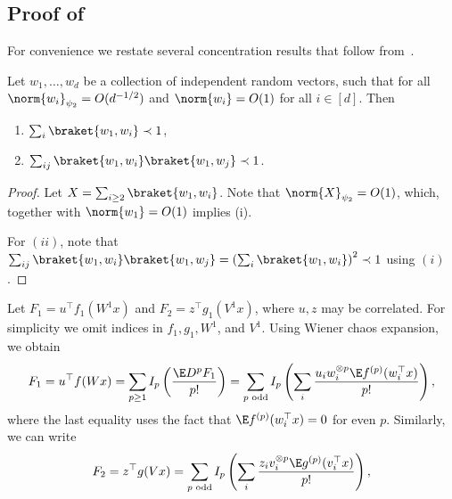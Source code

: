 
\subsection{Proof of~}
For convenience we restate several concentration results that follow from~.
\begin{lemma}
\label{lem:conc_inequalities}
    Let \(w_1, \ldots, w_d\) be a collection of independent random vectors, such that for all \(\norm{w_i}_{\psi_2} = O(d^{-1/2})\) and \(\norm{w_i} = O(1)\) for all \(i \in [d]\).
    Then 
    \begin{enumerate}[label=(\roman*)]
        \item \(\sum_i \braket{w_1, w_i} \prec 1\),
        \item \(\sum_{ij} \braket{w_1, w_i} \braket{w_1, w_j} \prec 1\).
    \end{enumerate}
\end{lemma}
\begin{proof}
    Let \(X = \sum_{i \geq 2} \braket{w_1, w_i}\). Note that \(\norm{X}_{\psi_2} = O(1)\), which, together with \(\norm{w_1} = O(1)\) implies (i).

    For \((ii)\), note that \(\sum_{ij} \braket{w_1, w_i} \braket{w_1, w_j} = \left(\sum_i \braket{w_1, w_i}\right)^2 \prec 1\) using \((i)\).
\end{proof}
Let \(F_1 = u^\top f_1(W^1 x)\) and \(F_2 = z^\top g_1(V^1 x)\), where \(u, z\) may be correlated. 
For simplicity we omit indices in \(f_1, g_1, W^1\), and \(V^1\).
Using Wiener chaos expansion, we obtain
\begin{equation}
    F_1 = u^\top f(Wx) = \sum_{p \geq 1} I_p\left(\frac{\E D^p F_1}{p!}\right) = \sum_{p \text{ odd}} I_p \left(\sum_i \frac{u_i w_i^{\otimes p} \E f^{(p)} (w_i^\top x)}{p!}\right),
\end{equation}
where the last equality uses the fact that \(\E f^{(p)} (w_i^\top x) = 0\) for even \(p\).
 Similarly, we can write
\begin{equation}
    F_2 = z^\top g(Vx) = \sum_{p \text{ odd}} I_p \left(\sum_i \frac{z_i v_i^{\otimes p} \E g^{(p)} (v_i^\top x)}{p!}\right),
\end{equation}
